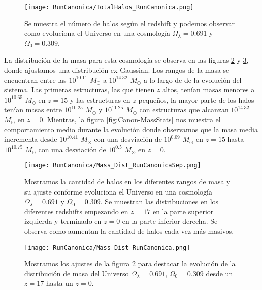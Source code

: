 \begin{figure}[H]
    \centering
    \texttt{[image: RunCanonica/TotalHalos\_RunCanonica.png]}
    \caption[Evolución del número de halos en un Universo $\Omega_\lambda = 0.691 $, $\Omega_0 = 0.309$]{\footnotesize Se muestra el número de halos según el redshift y podemos observar como evoluciona el Universo en una cosmología $\Omega_\lambda = 0.691 $ y $\Omega_0 = 0.309$.}
    \label{fig:Canon_TotalHalos}
\end{figure}

La distribución de la masa para esta cosmología se observa en las figuras \ref{fig:Canon-MassDistSep} y \ref{fig:Canon-MassDist}, donde ajustamos una distribución ex-Gaussian. Los rangos de la masa se encuentran entre las $10^{10.11}$ $M_\odot$ a $10^{14.32}$ $M_\odot$ a lo largo de de la evolución del sistema. Las primeras estructuras, las que tienen $z$ altos, tenían masas menores a $10^{10.65}$ $M_\odot$ en $z=15$ y las estructuras en $z$ pequeños, la mayor parte de los halos tenían masas entre $10^{10.25}$ $M_\odot$ y $10^{11.25}$ $M_\odot$ con estructuras que alcanzan $10^{14.32}$ $M_\odot$ en $z=0$. Mientras, la figura \ref{fig:Canon-MassStats} nos muestra el comportamiento medio durante la evolución donde observamos que la masa media incrementa desde $10^{10.41}$ $M_\odot$ con una desviación de $10^{0.09}$ $M_\odot$ en $z=15$ hasta $10^{10.75}$ $M_\odot$ con una desviación de $10^{0.5}$ $M_\odot$ en $z=0$.

\begin{figure}[H]
    \centering
    \texttt{[image: RunCanonica/Mass\_Dist\_RunCanonicaSep.png]}
    \caption[Distribución de masa]{\footnotesize Mostramos la cantidad de halos en los diferentes rangos de masa y su ajuste conforme evoluciona el Universo en una cosmología $\Omega_\lambda = 0.691 $ y $\Omega_0 = 0.309$. Se muestran las distribuciones en los diferentes redshifts empezando en $z=17$ en la parte superior izquierda y terminado en $z=0$ en la parte inferior derecha. Se observa como aumentan la cantidad de halos cada vez más masivos.}
    \label{fig:Canon-MassDistSep}
\end{figure}

\begin{figure}[H]
    \centering
    \texttt{[image: RunCanonica/Mass\_Dist\_RunCanonica.png]}
    \caption[Comparación de distribución de masa]{\footnotesize  Mostramos los ajustes de la figura \ref{fig:Canon-MassDistSep} para destacar la evolución de la distribución de masa del Universo $\Omega_\lambda = 0.691 $, $\Omega_0 = 0.309$ desde un $z=17$ hasta un $z=0$.}
    \label{fig:Canon-MassDist}
\end{figure}

